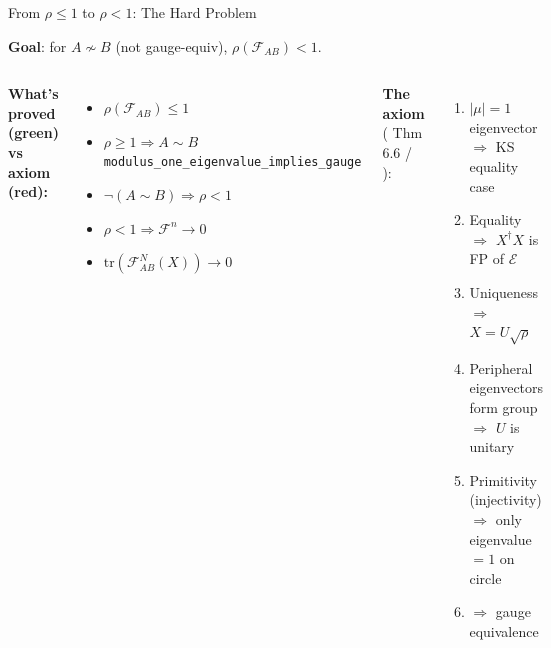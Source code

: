 \documentclass[aspectratio=169,10pt]{beamer}
\begin{document}
\begin{frame}{From $\rho \leq 1$ to $\rho < 1$: The Hard Problem}
    \vspace{-0.5em}

    \textbf{Goal}: for $A \not\sim B$ (not gauge-equiv), $\rho(\mathcal{F}_{AB}) < 1$.

    \vspace{0.1em}
    \begin{columns}[T]
        \textbf{What's proved (green) vs axiom (red):}
        \begin{itemize}\itemsep0.06em\small
            \item[\textcolor{leangreen}{\checkmark}] $\rho(\mathcal{F}_{AB}) \leq 1$
            \item[\textcolor{softred}{\texttt{ax}}] $\rho \geq 1 \Rightarrow A \sim B$\\
                {\tiny \texttt{modulus\_one\_eigenvalue\_implies\_gauge}}
            \item[\textcolor{leangreen}{\checkmark}] $\neg(A \sim B) \Rightarrow \rho < 1$
            \item[\textcolor{leangreen}{\checkmark}] $\rho < 1 \Rightarrow \mathcal{F}^n \to 0$
            \item[\textcolor{leangreen}{\checkmark}] $\mathrm{tr}(\mathcal{F}_{AB}^N(X)) \to 0$
        \end{itemize}

        \textbf{The axiom} (\cite{Wolf2012Quantum} Thm 6.6 / \cite{Perez-Garcia2007Matrix}):
        \begin{enumerate}\itemsep0.04em\small
            \item $|\mu| = 1$ eigenvector\\
                $\Rightarrow$ KS equality case
            \item Equality $\Rightarrow$ $X^\dagger X$ is FP of $\mathcal{E}$
            \item Uniqueness $\Rightarrow$ $X = U\sqrt{\rho}$
            \item Peripheral eigenvectors form group\\
                $\Rightarrow$ $U$ is unitary
            \item Primitivity (injectivity)\\
                $\Rightarrow$ only eigenvalue $= 1$ on circle
            \item $\Rightarrow$ gauge equivalence
        \end{enumerate}
    \end{columns}


\end{frame}
\end{document}

